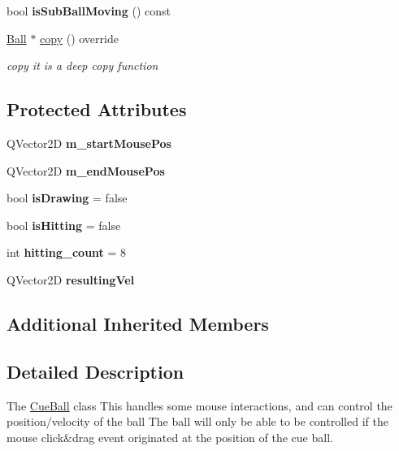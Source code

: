 \begin{DoxyCompactItemize}
\mbox{\label{class_cue_ball_a7035345f6ba5c29052a5a1444e3f076f}} 
bool {\bfseries is\+Sub\+Ball\+Moving} () const
\item 
\mbox{\hyperlink{class_ball}{Ball}} $\ast$ \mbox{\hyperlink{class_cue_ball_a9c2d69ffe6892cba695ef34e360b5dae}{copy}} () override
\begin{DoxyCompactList}\small\item\em copy it is a deep copy function \end{DoxyCompactList}\end{DoxyCompactItemize}
\subsection*{Protected Attributes}
\begin{DoxyCompactItemize}
\item 
\mbox{\label{class_cue_ball_a31c90da6dfe1fcaba9dae9a9860028b9}} 
Q\+Vector2D {\bfseries m\+\_\+start\+Mouse\+Pos}
\item 
\mbox{\label{class_cue_ball_a2266dea32739c919dbd7848167536a4e}} 
Q\+Vector2D {\bfseries m\+\_\+end\+Mouse\+Pos}
\item 
\mbox{\label{class_cue_ball_a83f8528e08491dc39f22888ddd3bfdff}} 
bool {\bfseries is\+Drawing} = false
\item 
\mbox{\label{class_cue_ball_ade31163403f593728955ee17d7bfa52e}} 
bool {\bfseries is\+Hitting} = false
\item 
\mbox{\label{class_cue_ball_a7d96d4cd6ddda11c9be9ef7c6de36701}} 
int {\bfseries hitting\+\_\+count} = 8
\item 
\mbox{\label{class_cue_ball_a8c9e20f373e0fdb320f2caf482667091}} 
Q\+Vector2D {\bfseries resulting\+Vel}
\end{DoxyCompactItemize}
\subsection*{Additional Inherited Members}


\subsection{Detailed Description}
The \mbox{\hyperlink{class_cue_ball}{Cue\+Ball}} class This handles some mouse interactions, and can control the position/velocity of the ball The ball will only be able to be controlled if the mouse click\&drag event originated at the position of the cue ball. 

